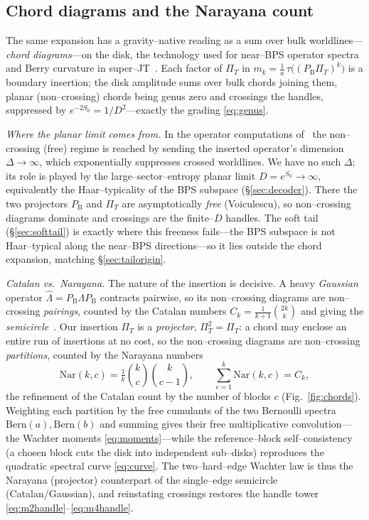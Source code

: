 \documentclass[11pt]{article}
\newcommand{\PB}{P_{\mathrm B}}
\newcommand{\PiT}{\Pi_T}
\newcommand{\Bern}{\mathrm{Bern}}
\begin{document}
\subsection{Chord diagrams and the Narayana count}
\label{sec:chords}
The same expansion has a gravity--native reading as a sum over bulk worldlines---\emph{chord
diagrams}---on the disk, the technology used for near--BPS operator spectra and Berry curvature in
super--JT~\cite{LMRS,Berry}. Each factor of $\PiT$ in $m_k=\tfrac1a\,\tau\big((\PB\PiT)^k\big)$ is a
boundary insertion; the disk amplitude sums over bulk chords joining them, planar (non--crossing) chords
being genus zero and crossings the handles, suppressed by $e^{-2S_0}=1/D^2$---exactly the grading
\eqref{eq:genus}.

\smallskip\noindent\emph{Where the planar limit comes from.} In the operator computations
of~\cite{LMRS,Berry} the non--crossing (free) regime is reached by sending the inserted operator's
dimension $\Delta\to\infty$, which exponentially suppresses crossed worldlines. We have no such
$\Delta$; its role is played by the large--sector--entropy planar limit $D=e^{S_0}\to\infty$,
equivalently the Haar--typicality of the BPS subspace (\S\ref{sec:decoder}). There the two projectors
$\PB$ and $\PiT$ are asymptotically \emph{free} (Voiculescu), so non--crossing diagrams dominate and
crossings are the finite--$D$ handles. The soft tail (\S\ref{sec:softtail}) is exactly where this
freeness fails---the BPS subspace is not Haar--typical along the near--BPS directions---so it lies
outside the chord expansion, matching \S\ref{sec:tailorigin}.

\smallskip\noindent\emph{Catalan vs.\ Narayana.} The nature of the insertion is decisive. A heavy
\emph{Gaussian} operator $\hat\Lambda=\PB\Lambda\PB$ contracts pairwise, so its non--crossing diagrams
are non--crossing \emph{pairings}, counted by the Catalan numbers $C_k=\tfrac1{k+1}\binom{2k}{k}$ and
giving the \emph{semicircle}~\cite{LMRS,Berry}. Our insertion $\PiT$ is a \emph{projector},
$\PiT^2=\PiT$: a chord may enclose an entire run of insertions at no cost, so the non--crossing diagrams
are non--crossing \emph{partitions}, counted by the Narayana numbers
\begin{equation}
  \mathrm{Nar}(k,c)=\tfrac1k\binom{k}{c}\binom{k}{c-1},\qquad \sum_{c=1}^{k}\mathrm{Nar}(k,c)=C_k ,
  \label{eq:narayana}
\end{equation}
the refinement of the Catalan count by the number of blocks $c$ (Fig.~\ref{fig:chords}). Weighting each
partition by the free cumulants of the two Bernoulli spectra $\Bern(a),\Bern(b)$ and summing gives their
free multiplicative convolution---the Wachter moments \eqref{eq:moments}---while the reference--block
self--consistency (a chosen block cuts the disk into independent sub--disks) reproduces the quadratic
spectral curve \eqref{eq:curve}. The two--hard--edge Wachter law is thus the Narayana (projector)
counterpart of the single--edge semicircle (Catalan/Gaussian), and reinstating crossings restores the
handle tower \eqref{eq:m2handle}--\eqref{eq:m4handle}.
\end{document}
